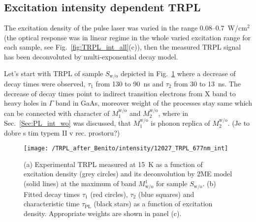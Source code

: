 \newpage
\subsection{Excitation intensity dependent TRPL}
The excitation density of the pulse laser was varied in the range 0.08--0.7~W/cm$^2$ (the optical response was in linear regime in the whole varied excitation range for each sample, see Fig.~\ref{fig:TRPL_int_all}(c)), then the measured TRPL signal has been deconvoluted by multi-exponential decay model. %

Let's start with TRPL of sample $S_\mathrm{w/o}$ depicted in Fig.~\ref{fig:TRPL_int_wo} where a decrease of decay times were observed, $\tau_1$ from 130 to 90~ns and $\tau_2$ from 30 to 13~ns.
The decrease of decay times point to indirect transition electrons from X band to heavy holes in $\Gamma$ band in GaAs, moreover weight of the processes stay same which can be connected with character of $M_1^\mathrm{w/o}$ and $M_2^\mathrm{w/o}$, where in Sec.~\ref{Sec:PL_int_wo} was discussed, that $M_1^\mathrm{w/o}$ is phonon replica of $M_2^\mathrm{w/o}$. (Je to dobre s tim typem II v rec. prostoru?)


%

\begin{figure}
	\centering
	\texttt{[image: /TRPL\_after\_Benito/intensity/12027\_TRPL\_677nm\_int]}
	\caption{(a) Experimental TRPL measured at 15~K as a function of excitation density (grey circles) and its deconvolution by 2ME model (solid lines) at the maximum of band $M^1_\mathrm{w/o}$ for sample $S_\mathrm{w/o}$. (b) Fitted decay times $\tau_1$ (red circles), $\tau_2$ (blue squares) and characteristic time $\tau_\mathrm{PL}$ (black stars) as a function of excitation density. Appropriate weights are shown in panel (c).}
	\label{fig:TRPL_int_wo}
\end{figure}

